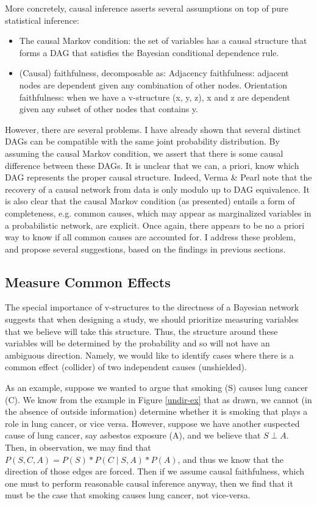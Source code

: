 \documentclass{article}
\begin{document}
	More concretely, causal inference asserts several assumptions on top of pure statistical inference\cite{ramsey2012adjacencyfaithfulness}:
	\begin{itemize}
		\item The causal Markov condition: the set of variables has a causal structure that forms a DAG that satisfies the Bayesian conditional dependence rule.
		\item (Causal) faithfulness, decomposable as:
			\subitem Adjacency faithfulness: adjacent nodes are dependent given any combination of other nodes.
			\subitem Orientation faithfulness: when we have a v-structure (x, y, z), x and z are dependent given any subset of other nodes that contains y.
	\end{itemize}
	However, there are several problems.
	I have already shown that several distinct DAGs can be compatible with the same joint probability distribution.
	By assuming the causal Markov condition, we assert that there is some causal difference between these DAGs.
	It is unclear that we can, a priori, know which DAG represents the proper causal structure.
	Indeed, Verma \& Pearl note that the recovery of a causal network from data is only modulo up to DAG equivalence\cite{verma2013equivalence}.
	It is also clear that the causal Markov condition (as presented) entails a form of completeness, e.g. common causes, which may appear as marginalized variables in a probabilistic network, are explicit.
	Once again, there appears to be no a priori way to know if all common causes are accounted for.
	I address these problem, and propose several suggestions, based on the findings in previous sections.
	
	\subsection{Measure Common Effects}
	The special importance of v-structures to the directness of a Bayesian network suggests that when designing a study, we should prioritize measuring variables that we believe will take this structure.
	Thus, the structure around these variables will be determined by the probability and so will not have an ambiguous direction.
	Namely, we would like to identify cases where there is a common effect (collider) of two independent causes (unshielded).
	
	As an example, suppose we wanted to argue that smoking (S) causes lung cancer (C).
	We know from the example in Figure \ref{undir-ex} that as drawn, we cannot (in the absence of outside information) determine whether it is smoking that plays a role in lung cancer, or vice versa.
	However, suppose we have another suspected cause of lung cancer, say asbestos exposure (A), and we believe that $S \perp A$.
	Then, in observation, we may find that $P(S, C, A) = P(S)*P(C \mid S, A)*P(A)$, and thus we know that the direction of those edges are forced.
	Then if we assume causal faithfulness, which one must to perform reasonable causal inference anyway, then we find that it must be the case that smoking causes lung cancer, not vice-versa.
	
\end{document}
